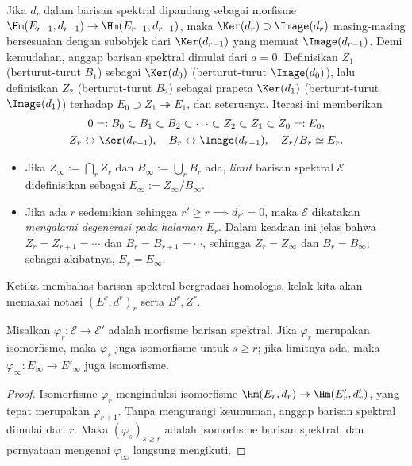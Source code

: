 Jika $d_r$ dalam barisan spektral dipandang sebagai morfisme
$\Hm(E_{r-1},d_{r-1})\to\Hm(E_{r-1},d_{r-1})$, maka
$\Ker(d_r)\supset\Image(d_r)$ masing-masing bersesuaian dengan subobjek dari
$\Ker(d_{r-1})$ yang memuat $\Image(d_{r-1})$. Demi kemudahan,
anggap barisan spektral dimulai dari $a=0$. Definisikan $Z_1$ (berturut-turut
$B_1$) sebagai $\Ker(d_0)$ (berturut-turut $\Image(d_0)$), lalu definisikan
$Z_2$ (berturut-turut $B_2$) sebagai prapeta $\Ker(d_1)$ (berturut-turut
$\Image(d_1)$) terhadap $E_0\supset Z_1\twoheadrightarrow E_1$, dan seterusnya.
Iterasi ini memberikan
\begin{equation}\label{eqn:spectral-sequence-Z-B}\begin{gathered}
	0=:B_0\subset B_1\subset B_2\subset\cdots\subset Z_2\subset Z_1
	\subset Z_0=:E_0, \\
	Z_r\leftrightarrow\Ker(d_{r-1}),\quad
	B_r\leftrightarrow\Image(d_{r-1}),\quad Z_r/B_r\simeq E_r.
\end{gathered}\end{equation}

\begin{itemize}
	\item Jika $Z_\infty:=\bigcap_rZ_r$ dan $B_\infty:=\bigcup_rB_r$ ada,
	\emph{limit} barisan spektral $\mathscr{E}$ didefinisikan sebagai
	$E_\infty:=Z_\infty/B_\infty$.
	\item Jika ada $r$ sedemikian sehingga $r'\geq r\implies d_{r'}=0$, maka
	$\mathscr{E}$ dikatakan \emph{mengalami degenerasi pada halaman $E_r$}.
	Dalam keadaan ini jelas bahwa $Z_r=Z_{r+1}=\cdots$ dan
	$B_r=B_{r+1}=\cdots$, sehingga $Z_r=Z_\infty$ dan $B_r=B_\infty$;
	sebagai akibatnya, $E_r=E_\infty$.
\end{itemize}

Ketika membahas barisan spektral bergradasi homologis, kelak kita akan memakai
notasi $(E^r,d^r)_r$ serta $B^r,Z^r$.

\begin{proposition}\label{prop:ss-isom-infty}
	Misalkan $\varphi_r:\mathscr{E}\to\mathscr{E}'$ adalah morfisme barisan
	spektral. Jika $\varphi_r$ merupakan isomorfisme, maka $\varphi_s$ juga
	isomorfisme untuk $s\geq r$; jika limitnya ada, maka
	$\varphi_\infty:E_\infty\to E'_\infty$ juga isomorfisme.
\end{proposition}
\begin{proof}
	Isomorfisme $\varphi_r$ menginduksi isomorfisme
	$\Hm(E_r,d_r)\to\Hm(E'_r,d'_r)$, yang tepat merupakan
	$\varphi_{r+1}$. Tanpa mengurangi keumuman, anggap barisan spektral dimulai
	dari $r$. Maka $(\varphi_s)_{s\geq r}$ adalah isomorfisme barisan spektral,
	dan pernyataan mengenai $\varphi_\infty$ langsung mengikuti.
\end{proof}

